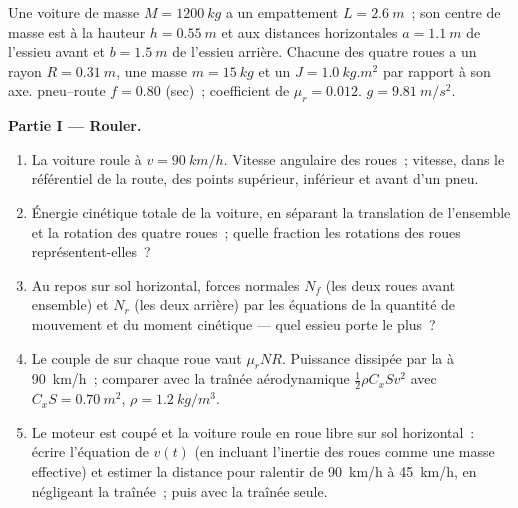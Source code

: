 \begin{problem}
\label{pb:b2:rigid-body-mechanics:1}

Une voiture de masse $M = \qty{1200}{kg}$ a un empattement $L = \qty{2.6}{m}$~; son
centre de masse est à la hauteur $h = \qty{0.55}{m}$ et aux distances horizontales
$a = \qty{1.1}{m}$ de l'essieu avant et $b = \qty{1.5}{m}$ de l'essieu
arrière. Chacune des quatre roues a un rayon $R = \qty{0.31}{m}$, une masse $m =
\qty{15}{kg}$ et un  $J = \qty{1.0}{kg.m^2}$ par rapport à son axe.
 pneu--route $f = 0.80$ (sec)~; coefficient de
 $\mu_r = 0.012$. $g = \qty{9.81}{m/s^2}$.

\medskip
\noindent\textbf{Partie I --- Rouler.}
\begin{enumerate}
  \item La voiture roule à $v = \qty{90}{km/h}$. Vitesse angulaire des
        roues~; vitesse, dans le référentiel de la route, des points supérieur, inférieur et
        avant d'un pneu.
  \item Énergie cinétique totale de la voiture, en séparant la translation de
        l'ensemble et la rotation des quatre roues~; quelle fraction
        les rotations des roues représentent-elles~?
  \item Au repos sur sol horizontal, forces normales $N_f$ (les deux roues avant
        ensemble) et $N_r$ (les deux arrière) par les équations de la quantité de mouvement et du
        moment cinétique --- quel essieu porte le plus~?
  \item Le couple de  sur chaque roue vaut $\mu_rNR$. Puissance
        dissipée par la  à \qty{90}{km/h}~; comparer avec
        la traînée aérodynamique $\tfrac12\rho C_xSv^2$ avec $C_xS =
        \qty{0.70}{m^2}$, $\rho = \qty{1.2}{kg/m^3}$.
  \item Le moteur est coupé et la voiture roule en roue libre sur sol horizontal~: écrire
        l'équation de $v(t)$ (en incluant l'inertie des roues comme une masse
        effective) et estimer la distance pour ralentir de \qty{90}{km/h} à
        \qty{45}{km/h}, en négligeant la traînée~; puis avec la traînée seule.
\end{enumerate}


\end{problem}
